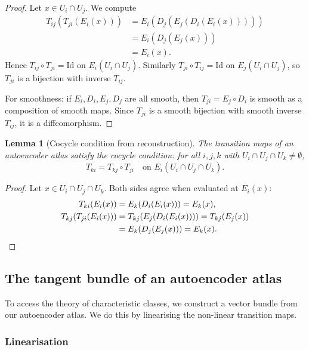 \documentclass[11pt]{article}
\theoremstyle{plain}
\newtheorem{lemma}[theorem]{Lemma}
\theoremstyle{definition}
\theoremstyle{remark}
\begin{document}
\begin{proof}
Let $x \in U_i \cap U_j$. We compute
\begin{align*}
T_{ij}(T_{ji}(E_i(x))) &= E_i(D_j(E_j(D_i(E_i(x))))) \\
&= E_i(D_j(E_j(x))) \\
&= E_i(x).
\end{align*}
Hence $T_{ij} \circ T_{ji} = \mathrm{Id}$ on $E_i(U_i \cap U_j)$. Similarly $T_{ji} \circ T_{ij} = \mathrm{Id}$ on $E_j(U_i \cap U_j)$, so $T_{ji}$ is a bijection with inverse $T_{ij}$.

For smoothness: if $E_i, D_i, E_j, D_j$ are all smooth, then $T_{ji} = E_j \circ D_i$ is smooth as a composition of smooth maps. Since $T_{ji}$ is a smooth bijection with smooth inverse $T_{ij}$, it is a diffeomorphism.
\end{proof}

\begin{lemma}[Cocycle condition from reconstruction]\label{lemma:cocycle-from-reconstruction}
The transition maps of an autoencoder atlas satisfy the cocycle condition: for all $i, j, k$ with $U_i \cap U_j \cap U_k \neq \emptyset$,
\[
T_{ki} = T_{kj} \circ T_{ji} \quad \text{on } E_i(U_i \cap U_j \cap U_k).
\]
\end{lemma}

\begin{proof}
Let $x \in U_i \cap U_j \cap U_k$. Both sides agree when evaluated at $E_i(x)$:
\begin{align*}
T_{ki}(E_i(x)) &= E_k(D_i(E_i(x))) = E_k(x), \\
T_{kj}(T_{ji}(E_i(x))) &= T_{kj}(E_j(D_i(E_i(x)))) = T_{kj}(E_j(x)) \\
&= E_k(D_j(E_j(x))) = E_k(x). \qedhere
\end{align*}
\end{proof}

\subsection{The tangent bundle of an autoencoder atlas}\label{sec:tangent-bundle}

To access the theory of characteristic classes, we construct a vector bundle from our autoencoder atlas. We do this by linearising the non-linear transition maps.

\subsubsection{Linearisation}
\end{document}
